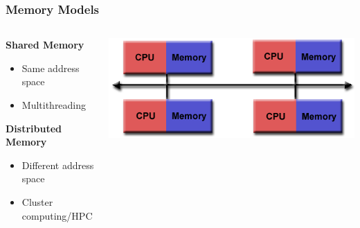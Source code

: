 \documentclass[t]{beamer}
\begin{document}
\begin{frame}
\frametitle{Memory Models}
\begin{columns}
\begin{column}{.4\textwidth}
\textbf{Shared Memory}
\begin{itemize}
  \item Same address space
  \item Multithreading
\end{itemize}

\textbf{Distributed Memory}
\begin{itemize}
  \item Different address space
  \item Cluster computing/HPC
\end{itemize}
\end{column}

\begin{column}{.6\textwidth}
\begin{center}
\includegraphics[width=1.0\textwidth]{img/distributed_mem.png} 
\end{center}
\end{column}
\end{columns}
\end{frame}
\end{document}
